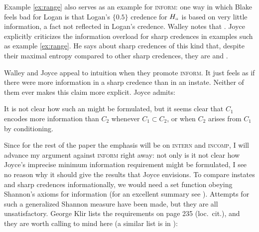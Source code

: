 \documentclass[11pt]{article}
\begin{document}
Example \ref{ex:range} also serves as an example for \textsc{inform}:
one way in which Blake feels bad for Logan is that Logan's $\{0.5\}$
credence for $H_{\mbox{\tiny{ii}}}$ is based on very little
information, a fact not reflected in Logan's credence. Walley notes
that 
. Joyce explicitly criticizes the information
overload for sharp credences in examples such as example
\ref{ex:range}. He says about sharp credences of this kind that,
despite their maximal entropy compared to other sharp credences, they
are  and  .

Walley and Joyce appeal to intuition when they promote
\textsc{inform}. It just feels as if there were more information in a
sharp credence than in an instate. Neither of them ever makes this
claim more explicit. Joyce admits:

\begin{quotex}
  It is not clear how such an  might be formulated, but it seems clear that $C_{1}$
  encodes more information than $C_{2}$ whenever
  $C_{1}\subset{}C_{2}$, or when $C_{2}$ arises from $C_{1}$ by
  conditioning. 
\end{quotex}

Since for the rest of the paper the emphasis will be on
\textsc{intern} and \textsc{incomp}, I will advance my argument
against \textsc{inform} right away: not only is it not clear how
Joyce's imprecise minimum information requirement might be formulated,
I see no reason why it should give the results that Joyce envisions.
To compare instates and sharp credences informationally, we would need
a set function obeying Shannon's axioms for information (for an
excellent summary see ). Attempts for such a
generalized Shannon measure have been made, but they are all
unsatisfactory. George Klir lists the requirements on page 235 (loc.\
cit.), and they are worth calling to mind here (a similar list is in
\scite{8}{mork13}{363}):
\end{document}
